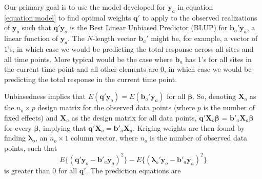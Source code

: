 \documentclass[smallextended]{svjour3}       %
\begin{document}
Our primary goal is to use the model developed for \(\mathbf{y}_a\) in
equation \ref{equation:model} to find optimal weights \(\mathbf{q}'\) to
apply to the observed realizations of \(\mathbf{y}_o\) such that
\(\mathbf{q}' \mathbf{y}_o\) is the Best Linear Unbiased Predictor
(BLUP) for \(\mathbf{b}_a' \mathbf{y}_a\), a linear function of
\(\mathbf{y}_a\). The \(N\)-length vector \(\mathbf{b}_a'\) might be,
for example, a vector of \(1\)'s, in which case we would be predicting
the total response across all sites and all time points. More typical
would be the case where \(\mathbf{b}_a\) has \(1\)'s for all sites in
the current time point and all other elements are \(0\), in which case
we would be predicting the total response in the current time point.

Unbiasedness implies that
\(E(\mathbf{q'}\mathbf{y}_o) = E(\mathbf{b}_a'\mathbf{y}_a)\) for all
\(\bm{\beta}\). So, denoting \(\mathbf{X}_o\) as the \(n_o \times p\)
design matrix for the observed data points (where \(p\) is the number of
fixed effects) and \(\mathbf{X}_a\) as the design matrix for all data
points, \(\mathbf{q'} \mathbf{X}_o \bm{\beta}\) =
\(\mathbf{b'}_a \mathbf{X}_a \bm{\beta}\) for every \(\bm{\beta}\),
implying that \(\mathbf{q'} \mathbf{X}_o = \mathbf{b'}_a \mathbf{X}_a\).
Kriging weights are then found by finding \(\bm{\lambda}_o\), an
\(n_o \times 1\) column vector, where \(n_o\) is the number of observed
data points, such that \mbox{} \begin{equation}
E\{(\mathbf{q'}\mathbf{y}_o - \mathbf{b'}_a \mathbf{y}_a)^2\} - E\{(\bm{\lambda}_o'\mathbf{y}_o - \mathbf{b'}_a \mathbf{y}_a)^2\}
\end{equation} \noindent is greater than 0 for all \(\mathbf{q'}\). The
prediction equations are
\end{document}

